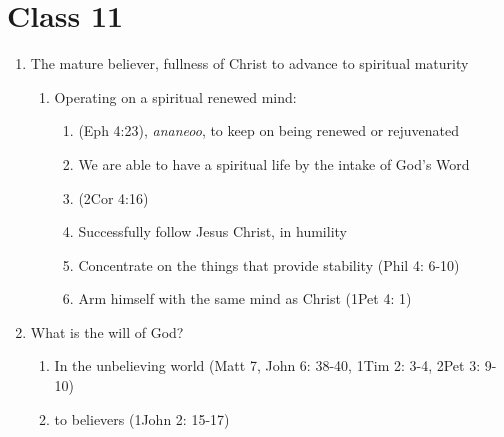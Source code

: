 \documentclass[11pt]{article}
\begin{document}
\begin{enumerate}
\begin{enumerate}
	\end{enumerate}
\end{enumerate}


\section*{Class 11}
\begin{enumerate}
	\item The mature believer, fullness of Christ to advance to spiritual maturity
	\begin{enumerate}
		\item Operating on a spiritual renewed mind:
		\begin{enumerate}
			\item (Eph 4:23), \emph{ananeoo}, to keep on being renewed or rejuvenated
			\item We are able to have a spiritual life by the intake of God's Word
			\item (2Cor 4:16)
			\item Successfully follow Jesus Christ, in humility
			\item Concentrate on the things that provide stability (Phil 4: 6-10)
			\item Arm himself with the same mind as Christ (1Pet 4: 1)
		\end{enumerate}
	\end{enumerate}
	\item What is the will of God?
	\begin{enumerate}
		\item In the unbelieving world (Matt 7, John 6: 38-40, 1Tim 2: 3-4, 2Pet 3: 9-10)
		\item to believers (1John 2: 15-17)
	\end{enumerate}
\end{enumerate}
\end{document}
